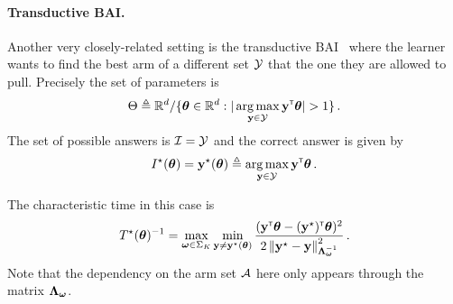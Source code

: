 
\paragraph{Transductive BAI.}\label{sec:lgc.formulation.examples.transductive}
Another very closely-related setting is the transductive BAI~\citep{fiez2019transductive} where the learner wants to find the best arm of a different set $\mathcal{Y}$ that the one they are allowed to pull. Precisely the set of parameters is 
\[
    \Theta \eqdef \R^d/\{\btheta\in\R^d: |\argmax_{\by\in\cY} \by\transpose\btheta|>1\}\,.
\]
The set of possible answers is $\mathcal{I} = \mathcal{Y}$ and the correct answer is given by 
\[
    I^\star({\boldsymbol \theta}) = {\bf y}^\star({\boldsymbol \theta}) \triangleq \operatorname*{arg\,max}_{{\bf y}\in\mathcal{Y}} {\bf y}^\mathsf{\scriptscriptstyle T}{\boldsymbol \theta}\,.
\]

The characteristic time in this case is
\[
    T^{\star}({\boldsymbol \theta})^{-1} = \max_{{\boldsymbol \omega}\in\Sigma_K} \min_{{\bf y}\neq {\bf y}^\star({\boldsymbol \theta})} \frac{({\bf y}^\mathsf{\scriptscriptstyle T}{\boldsymbol \theta}-({\bf y}^\star)^\mathsf{\scriptscriptstyle T}{\boldsymbol \theta})^2}{2\left\lVert{\bf y}^\star - {\bf y}\right\rVert^2_{{\boldsymbol \Lambda}_{{\boldsymbol \omega}}^{-1}}}\,.
\]
Note that the dependency on the arm set $\mathcal{A}$ here only appears through the matrix ${\boldsymbol \Lambda}_{{\boldsymbol \omega}}$.


